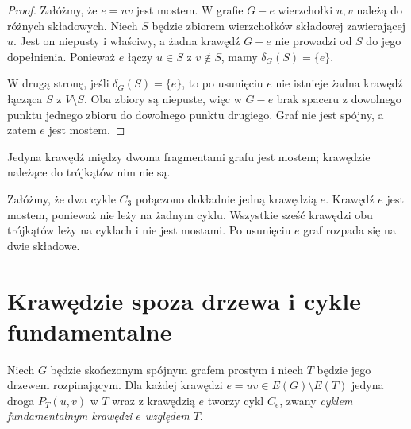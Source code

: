 \begin{proof}
Załóżmy, że $e=uv$ jest mostem. W grafie
$G-e$ wierzchołki $u,v$ należą do różnych
składowych. Niech $S$ będzie zbiorem
wierzchołków składowej zawierającej $u$.
Jest on niepusty i właściwy, a żadna krawędź
$G-e$ nie prowadzi od $S$ do jego dopełnienia.
Ponieważ $e$ łączy $u\in S$ z $v\notin S$,
mamy $\delta_G(S)=\{e\}$.

W drugą stronę, jeśli $\delta_G(S)=\{e\}$,
to po usunięciu $e$ nie istnieje żadna
krawędź łącząca $S$ z $V\setminus S$.
Oba zbiory są niepuste, więc w $G-e$
brak spaceru z dowolnego punktu jednego
zbioru do dowolnego punktu drugiego.
Graf nie jest spójny, a zatem $e$ jest mostem.
\end{proof}

\begin{center}

{\footnotesize Jedyna krawędź między dwoma fragmentami
grafu jest mostem; krawędzie należące do trójkątów nim nie są.}
\end{center}

\begin{przyklad}
Załóżmy, że dwa cykle $C_3$ połączono dokładnie jedną
krawędzią $e$. Krawędź $e$ jest mostem, ponieważ
nie leży na żadnym cyklu. Wszystkie sześć krawędzi
obu trójkątów leży na cyklach i nie jest mostami.
Po usunięciu $e$ graf rozpada się na dwie składowe.
\end{przyklad}

\section{Krawędzie spoza drzewa i cykle fundamentalne}
\label{sec:tg-fundamentalne}

\begin{definicja}
Niech $G$ będzie skończonym spójnym grafem
prostym i niech $T$ będzie jego drzewem
rozpinającym. Dla każdej krawędzi
$e=uv\in E(G)\setminus E(T)$ jedyna droga
$P_T(u,v)$ w $T$ wraz z krawędzią $e$
tworzy cykl $C_e$, zwany \emph{cyklem
fundamentalnym krawędzi $e$ względem $T$}.
\end{definicja}

